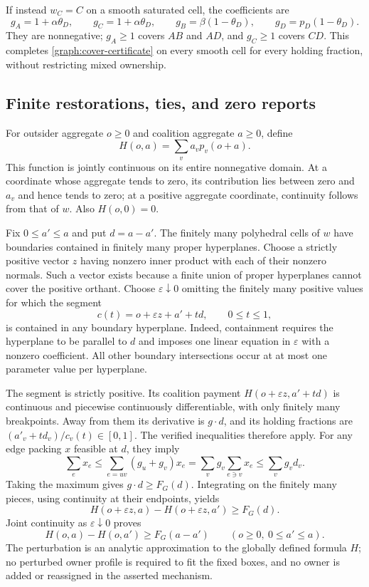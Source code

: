\documentclass[11pt]{article}
\theoremstyle{definition}\newtheorem{definition}[theorem]{Definition}
\theoremstyle{remark}\newtheorem{remark}[theorem]{Remark}
\begin{document}
If instead $w_C=C$ on a smooth saturated cell, the coefficients are
\[
 g_A=1+\alpha\theta_D,\qquad g_C=1+\alpha\theta_D,
 \qquad g_B=\beta(1-\theta_D),\qquad
 g_D=p_D(1-\theta_D).
\]
They are nonnegative; $g_A\ge1$ covers $AB$ and $AD$, and $g_C\ge1$
covers $CD$. This completes \eqref{graph:cover-certificate} on every
smooth cell for every holding fraction, without restricting mixed ownership.

\subsection{Finite restorations, ties, and zero reports}

For outsider aggregate $o\ge0$ and coalition aggregate $a\ge0$, define
\[
 H(o,a)=\sum_v a_v p_v(o+a).
\]
This function is jointly continuous on its entire nonnegative domain.
At a coordinate whose aggregate tends to zero, its contribution lies
between zero and $a_v$ and hence tends to zero; at a positive aggregate
coordinate, continuity follows from that of $w$. Also $H(o,0)=0$.

Fix $0\le a'\le a$ and put $d=a-a'$. The finitely many polyhedral cells
of $w$ have boundaries contained in finitely many proper hyperplanes.
Choose a strictly positive vector $z$ having nonzero inner product with
each of their nonzero normals. Such a vector exists because a finite union
of proper hyperplanes cannot cover the positive orthant. Choose
$\varepsilon\downarrow0$ omitting the finitely many positive values for
which the segment
\[
 c(t)=o+\varepsilon z+a'+td,\qquad 0\le t\le1,
\]
is contained in any boundary hyperplane. Indeed, containment requires the
hyperplane to be parallel to $d$ and imposes one linear equation in
$\varepsilon$ with a nonzero coefficient. All other boundary intersections
occur at at most one parameter value per hyperplane.

The segment is strictly positive. Its coalition payment
$H(o+\varepsilon z,a'+td)$ is continuous and piecewise continuously
differentiable, with only finitely many breakpoints. Away from them its
derivative is $g\cdot d$, and its holding fractions are
$(a'_v+td_v)/c_v(t)\in[0,1]$. The verified inequalities therefore apply.
For any edge packing $x$ feasible at $d$, they imply
\[
 \sum_e x_e\le\sum_{e=uv}(g_u+g_v)x_e
 =\sum_v g_v\sum_{e\ni v}x_e\le\sum_v g_vd_v.
\]
Taking the maximum gives $g\cdot d\ge F_G(d)$. Integrating on the
finitely many pieces, using continuity at their endpoints, yields
\[
 H(o+\varepsilon z,a)-H(o+\varepsilon z,a')\ge F_G(d).
\]
Joint continuity as $\varepsilon\downarrow0$ proves
\begin{equation}\label{graph:finite-out}
 H(o,a)-H(o,a')\ge F_G(a-a')
 \qquad(o\ge0,\ 0\le a'\le a).
\end{equation}
The perturbation is an analytic approximation to the globally defined
formula $H$; no perturbed owner profile is required to fit the fixed boxes,
and no owner is added or reassigned in the asserted mechanism.
\end{document}
